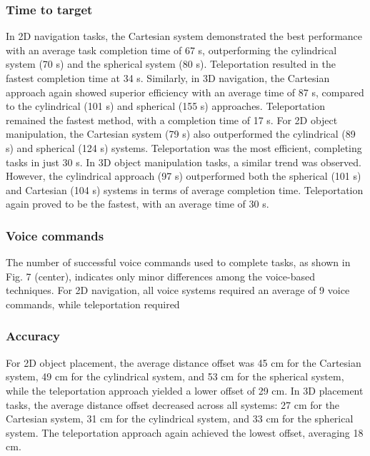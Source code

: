 \documentclass[preprint,12pt]{elsarticle}
\newcommand{\reftext}[1]{{\color{gray}#1}}   %
\begin{document}
\subsubsection{Time to target}
\reftext{In 2D navigation tasks, the Cartesian system demonstrated the best performance with an average task completion time of 67 s, outperforming the cylindrical system (70 s) and the spherical system (80 s). Teleportation resulted in the fastest completion time at 34 s. Similarly, in 3D navigation, the Cartesian approach again showed superior efficiency with an average time of 87 s, compared to the cylindrical (101 s) and spherical (155 s) approaches. Teleportation remained the fastest method, with a completion time of 17 s. For 2D object manipulation, the Cartesian system (79 s) also outperformed the cylindrical (89 s) and spherical (124 s) systems. Teleportation was the most efficient, completing tasks in just 30 s. In 3D object manipulation tasks, a similar trend was observed. However, the cylindrical approach (97 s) outperformed both the spherical (101 s) and Cartesian (104 s) systems in terms of average completion time. Teleportation again proved to be the fastest, with an average time of 30 s.}

\subsubsection{Voice commands}
\reftext{The number of successful voice commands used to complete tasks, as shown in Fig. 7 (center), indicates only minor differences among the voice-based techniques. For 2D navigation, all voice systems required an average of 9 voice commands, while teleportation required}

\subsubsection{Accuracy}
\reftext{For 2D object placement, the average distance offset was 45 cm for the Cartesian system, 49 cm for the cylindrical system, and 53 cm for the spherical system, while the teleportation approach yielded a lower offset of 29 cm. In 3D placement tasks, the average distance offset decreased across all systems: 27 cm for the Cartesian system, 31 cm for the cylindrical system, and 33 cm for the spherical system. The teleportation approach again achieved the lowest offset, averaging 18 cm.}
\end{document}
